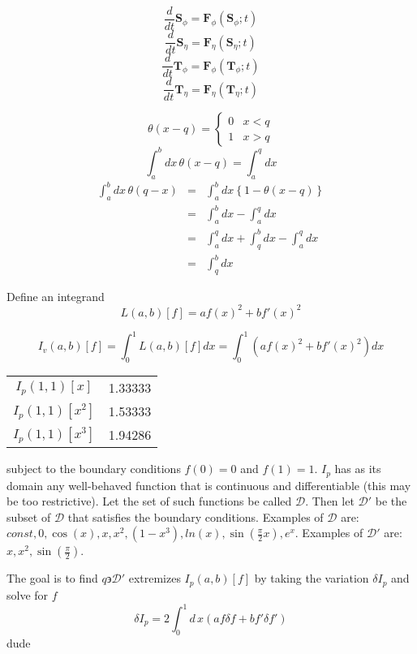 \documentclass[10pt]{article}
\begin{document}
\[
  \frac{d}{d t} {\mathbf S}_\phi = {\mathbf F}_\phi \left( {\mathbf S}_{\phi} ; t \right)
\]
\[
  \frac{d}{d t} {\mathbf S}_\eta = {\mathbf F}_\eta \left( {\mathbf S}_\eta ; t \right)
\]
\[
  \frac{d}{d t} {\mathbf T}_\phi = {\mathbf F}_\phi \left( {\mathbf T}_\phi ; t \right)
\]
\[
  \frac{d}{d t} {\mathbf T}_\eta = {\mathbf F}_\eta \left( {\mathbf T}_\eta ; t \right)
\]

\[
  \theta(x - q) = \left\{ \begin{array}{ll} 0 & x < q \\ 1 & x > q \end{array} \right.
\]
\[
 \int_{a}^{b} dx \, \theta(x-q) = \int_{a}^{q} d x
\]
\begin{eqnarray*}
 \int_{a}^{b} dx \, \theta(q - x)	& = & \int_{a}^{b} dx \left\{1 - \theta(x-q) \right\} \\
								& = & \int_{a}^{b} dx - \int_{a}^{q} dx \\
								& = & \int_{a}^{q} dx + \int_{q}^{b} dx - \int_{a}^{q} dx\\
								& = & \int_{q}^{b} dx
\end{eqnarray*}


\newpage
\null

Define an integrand
\[
  L(a,b)[f] = a f(x)^2 + b f'(x)^2
\]

\[
  I_v(a,b)[f] = \int_0^1 L(a,b)[f] dx = \int_0^1 \left( a f(x)^2 + b f'(x)^2 \right) dx
\]

\begin{tabular}{cc}
  $I_p(1,1)\left[x\right]$   & 1.33333 \\
  $I_p(1,1)\left[x^2\right]$ & 1.53333 \\
  $I_p(1,1)\left[x^3\right]$ & 1.94286
\end{tabular}
subject to the boundary conditions $f(0) = 0$ and $f(1) = 1$.
$I_p$ has as its domain any well-behaved function that is continuous and differentiable (this may be 
too restrictive).  Let the set of such functions be called $\mathcal D$.  Then let $\mathcal D'$ be
the subset of $\mathcal D$ that satisfies the boundary conditions.  Examples of $\mathcal D$ are:
$const, 0, \cos(x), x, x^2, (1-x^3), ln(x), \sin \left( \frac{\pi}{2} x \right), e^x$.  Examples
of $\mathcal D'$ are: $x, x^2, \sin \left( \frac{\pi}{2} \right)$.  


The goal is to find
$q \backepsilon {\mathcal D'}$ extremizes $I_p(a,b)[f]$ by taking the variation $\delta I_p$
and solve for $f$
\[
  \delta I_p = 2 \int_0^1 d\,x \left( a f \delta f + b f' \delta f' \right)
\]
\normalsize
\newpage
\null
dude
\end{document}
